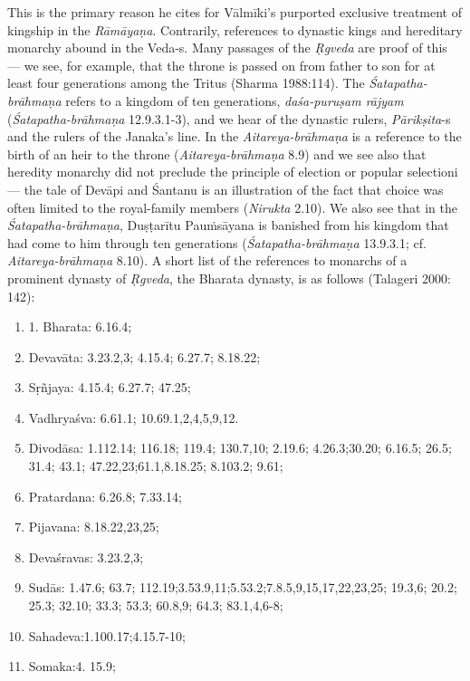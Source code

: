 This is the primary reason he cites for Vālmīki’s purported exclusive treatment of kingship in the {\sl Rāmāyaṇa}. Contrarily, references to dynastic kings and hereditary monarchy abound in the Veda-s. Many passages of the {\sl Ṛgveda} are proof of this --- we see, for example, that the throne is passed on from father to son for at least four generations among the Tritus (Sharma 1988:114). The {\sl Śatapatha-brāhmaṇa} refers to a kingdom of ten generations, {\sl daśa-puruṣam rājyam} ({\sl Śatapatha-brāhmaṇa} 12.9.3.1-3), and we hear of the dynastic rulers, {\sl Pārikṣita}-s and the rulers of the Janaka’s line. In the {\sl Aitareya-brāhmaṇa} is a reference to the birth of an heir to the throne ({\sl Aitareya-brāhmaṇa} 8.9) and we see also that heredity monarchy did not preclude the principle of election or popular selectioni--- the tale of Devāpi and Śantanu is an illustration of the fact that choice was often limited to the royal-family members ({\sl Nirukta} 2.10). We also see that in the {\sl Śatapatha-brāhmaṇa}, Duṣṭarītu Pauṁsāyana is banished from his kingdom that had come to him through ten generations ({\sl Śatapatha-brāhmaṇa} 13.9.3.1; cf. {\sl Aitareya-brāhmaṇa} 8.10). A short list of the references to monarchs of a prominent dynasty of {\sl Ṛgveda}, the Bharata dynasty, is as follows (Talageri 2000: 142):
\begin{enumerate}
\item 1. Bharata: 6.16.4;
\item Devavāta: 3.23.2,3; 4.15.4; 6.27.7; 8.18.22;
\item Sṛñjaya: 4.15.4; 6.27.7; 47.25;
\item Vadhryaśva:  6.61.1; 10.69.1,2,4,5,9,12. 
\item Divodāsa: 1.112.14; 116.18; 119.4; 130.7,10; 2.19.6; 4.26.3;30.20; 6.16.5; 26.5; 31.4; 43.1; 47.22,23;61.1,8.18.25; 8.103.2; 9.61;
\item Pratardana:  6.26.8; 7.33.14;
\item Pijavana: 8.18.22,23,25;
\item Devaśravas: 3.23.2,3;
\item Sudās: 1.47.6; 63.7; 112.19;3.53.9,11;5.53.2;7.8.5,9,15,17,22,23,25; 19.3,6; 20.2; 25.3; 32.10; 33.3; 53.3; 60.8,9; 64.3; 83.1,4,6-8; 
\item Sahadeva:1.100.17;4.15.7-10;
\item Somaka:4. 15.9;
\end{enumerate}

